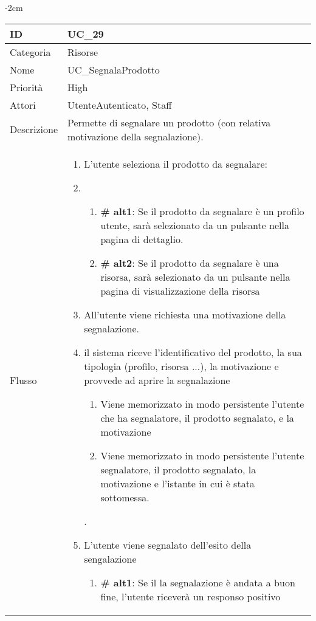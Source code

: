 \begin{center}
\begin{table}[bp]
    \centering
    \addtolength{\leftskip} {-2cm}
\begin{tabular}{ |p{2.6cm}|p{13cm}|  }
\hline
ID & UC\_29 \\\hline
Categoria & Risorse\\\hline
Nome & UC\_SegnalaProdotto\\\hline
Priorità & High \\\hline
Attori &  UtenteAutenticato, Staff \\\hline
Descrizione & Permette di segnalare un prodotto (con relativa motivazione della segnalazione).\\\hline
Flusso &  	\vspace{-5mm} \begin{enumerate}
			\item L'utente seleziona il prodotto da segnalare:
			\item \begin{enumerate}[label= ]
				\item \textbf{\# alt1}: Se il prodotto da segnalare è un profilo utente, sarà selezionato da un pulsante nella pagina di dettaglio.
				\item \textbf{\# alt2}: Se il prodotto da segnalare è una risorsa, sarà selezionato da un pulsante nella pagina di visualizzazione della risorsa
				\end{enumerate}
			\item All'utente viene richiesta una motivazione della segnalazione.
			\item il sistema riceve l'identificativo del prodotto, la sua tipologia (profilo, risorsa ...), la motivazione e provvede ad aprire la segnalazione
			\begin{enumerate}[label=\arabic*. ]
				\item Viene memorizzato in modo persistente l'utente che ha segnalatore, il prodotto segnalato, e la motivazione
				\item Viene memorizzato in modo persistente l'utente segnalatore, il prodotto segnalato, la motivazione e l'istante in cui è stata sottomessa.
			\end{enumerate}.
			\item L'utente viene segnalato dell'esito della sengalazione
			\begin{enumerate}[label= ]
				\item \textbf{\# alt1}: Se il la segnalazione è andata a buon fine, l'utente riceverà un responso positivo

\end{enumerate}
\end{enumerate}
\end{tabular}
\end{table}
\end{center}
